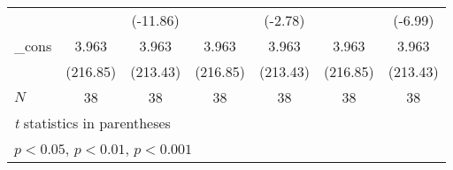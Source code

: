 {\begin{tabular}{l*{6}{c}}
            &                     &    (-11.86)         &                     &     (-2.78)         &                     &     (-6.99)         \\
[1em]
\_cons      &       3.963\sym{***}&       3.963\sym{***}&       3.963\sym{***}&       3.963\sym{***}&       3.963\sym{***}&       3.963\sym{***}\\
            &    (216.85)         &    (213.43)         &    (216.85)         &    (213.43)         &    (216.85)         &    (213.43)         \\
\hline
\(N\)       &          38         &          38         &          38         &          38         &          38         &          38         \\
\hline\hline
\multicolumn{7}{l}{\footnotesize \textit{t} statistics in parentheses}\\
\multicolumn{7}{l}{\footnotesize \sym{*} \(p<0.05\), \sym{**} \(p<0.01\), \sym{***} \(p<0.001\)}\\
\end{tabular}
}
